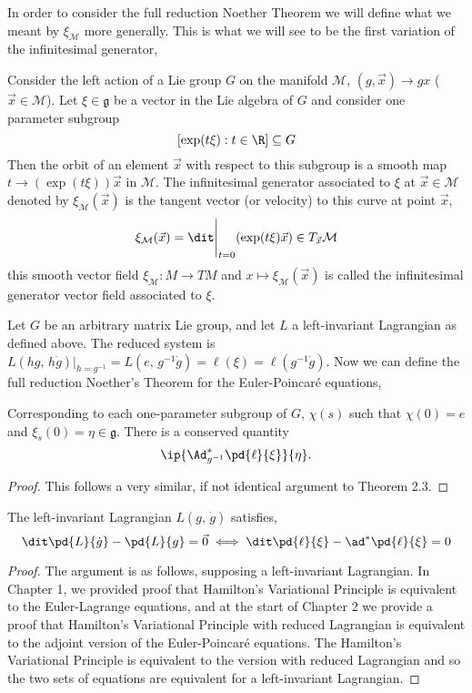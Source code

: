 \noindent
In order to consider the full reduction Noether Theorem we will define what we meant by $\xi_\mathcal{M}$ more generally. This is what we will see to be the first variation of the infinitesimal generator,
\begin{ndefi}
  Consider the left action of a Lie group $G$ on the manifold $\mathcal{M}$, $(g, \vec x) \to gx$ ($\vec x \in \mathcal{M}$). Let $\xi \in \mathfrak{g}$ be a vector in the Lie algebra of $G$ and consider one parameter subgroup $$[\exp(t\xi) : t \in \R] \subseteq G$$
  Then the orbit of an element $\vec x$ with respect to this subgroup is a smooth map $t \to (\exp(t\xi))\vec x$ in $\mathcal{M}$. The infinitesimal generator associated to $\xi$ at $\vec x \in \mathcal{M}$ denoted by $\xi_{\mathcal{M}}(\vec x)$ is the tangent vector (or velocity) to this curve at point $\vec x$,
  $$ \xi_{\mathcal{M}} (\vec x) = \dit\Bigg|_{t=0} (\exp(t \xi)\vec x) \in T_{\vec x}\mathcal{M} $$
  this smooth vector field $\xi_{\mathcal{M}} : M \to TM$ and $x \mapsto \xi_{\mathcal{M}}(\vec x)$ is called the infinitesimal generator vector field associated to $\xi$.
\end{ndefi}

\noindent
Let $G$ be an arbitrary matrix Lie group, and let $L$ a left-invariant Lagrangian as defined above. The reduced system is $L(hg,\, h\dot g)|_{h = g^{-1}} = L(e,\,g^{-1}\dot g) = \ell(\xi) = \ell(g^{-1}\dot g)$. Now we can define the full reduction Noether's Theorem for the Euler-Poincar\'e equations,
\begin{nthm}
  Corresponding to each one-parameter subgroup of $G$, $\chi(s)$ such that $\chi(0) = e$ and $\xi_s(0) = \eta \in \mathfrak{g}$. There is a conserved quantity
  $$ \ip{\Ad^*_{g^{-1}} \pd{\ell}{\xi}}{\eta}. $$
\end{nthm}
\begin{proof}
  This follows a very similar, if not identical argument to Theorem 2.3.
\end{proof}

\begin{nprop}
  The left-invariant Lagrangian $L(g,\,\dot g)$ satisfies,
  $$ \dit\pd{L}{\dot g} - \pd{L}{g} = \vec 0  \iff \dit\pd{\ell}{\xi} - \ad^*\pd{\ell}{\xi} = 0$$
\end{nprop}
\begin{proof}
  The argument is as follows, supposing a left-invariant Lagrangian. In Chapter 1, we provided proof that Hamilton's Variational Principle is equivalent to the Euler-Lagrange equations, and at the start of Chapter 2 we provide a proof that Hamilton's Variational Principle with reduced Lagrangian is equivalent to the adjoint version of the Euler-Poincar\'e equations. The Hamilton's Variational Principle is equivalent to the version with reduced Lagrangian and so the two sets of equations are equivalent for a left-invariant Lagrangian.
\end{proof}

